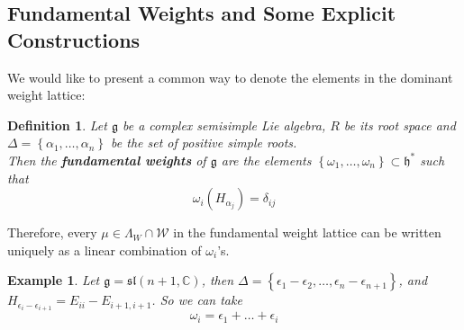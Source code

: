 \documentclass[11pt]{article}
\newtheorem{example}[theorem]{Example}
\newtheorem{definition}[theorem]{Definition}
\newcommand{\bb}[1]{\mathbb{#1}}
\newcommand{\mc}[1]{\mathcal{#1}}
\newcommand{\mf}[1]{\mathfrak{#1}}
\begin{document}
\subsection{Fundamental Weights and Some Explicit Constructions}
We would like to present a common way to denote the elements in the dominant weight lattice:
\begin{definition}
Let $\mf{g}$ be a complex semisimple Lie algebra, $R$ be its root space and $\Delta = \left\{ \alpha_1, \dots, \alpha_n\right\}$ be the set of positive simple roots.\\
Then the \textbf{fundamental weights} of $\mf{g}$ are the elements $\left\{ \omega_1, \dots, \omega_n \right\} \subset \mf{h}^*$ such that
$$\omega_i(H_{\alpha_j}) = \delta_{ij}$$
\end{definition}
Therefore, every $\mu \in \Lambda_W \cap \mc{W}$ in the fundamental weight lattice can be written uniquely as a linear combination of $\omega_i$'s.

\begin{example}
Let $\mf{g} = \mf{sl}(n+1,\bb{C})$, then $\Delta = \left\{\epsilon_1 - \epsilon_2, \dots, \epsilon_n - \epsilon_{n+1}\right\}$, and $H_{\epsilon_i - \epsilon_{i+1}} = E_{ii} - E_{i+1,i+1}$. So we can take
$$\omega_i = \epsilon_1 + \dots + \epsilon_i$$
\end{example}
\end{document}
